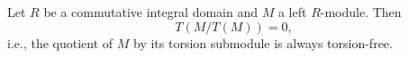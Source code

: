 Let $R$ be a commutative integral domain and $M$ a left $R$-module. Then
$$T(M/T(M)) = 0,$$
i.e., the quotient of $M$ by its torsion submodule is always torsion-free.
